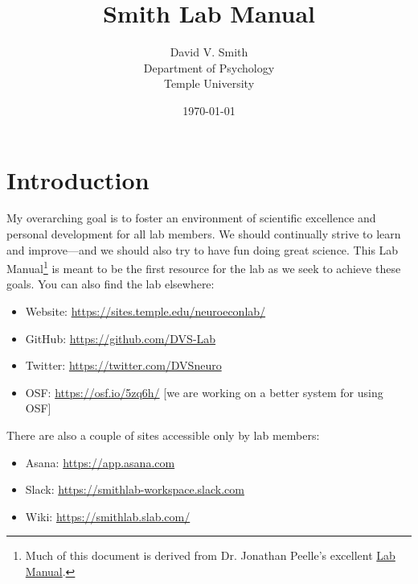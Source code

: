 \documentclass[letterpaper,11pt,oneside]{memoir}
\begin{document}
\title{Smith Lab Manual}
\author{David V. Smith\\Department of Psychology\\Temple University}
\date{\today}


\maketitle

\pagestyle{titlingpage}


\cleardoublepage
\frontmatter
\tableofcontents
\cleardoublepage

\mainmatter

\pagestyle{headings}

\chapter{Introduction}

My overarching goal is to foster an environment of scientific excellence and personal development for all lab members. We should continually strive to learn and improve---and we should also try to have fun doing great science. This Lab Manual\footnote{Much of this document is derived from Dr. Jonathan Peelle's excellent \href{https://github.com/jpeelle/peellelab\_manual/}{Lab Manual}.} is meant to be the first resource for the lab as we seek to achieve these goals. You can also find the lab elsewhere:

\begin{itemize}[noitemsep]
\item Website: \url{https://sites.temple.edu/neuroeconlab/}
\item GitHub: \url{https://github.com/DVS-Lab}
\item Twitter: \url{https://twitter.com/DVSneuro}
\item OSF: \url{https://osf.io/5zq6h/} \footnotesize{[we are working on a better system for using OSF]}
\end{itemize}

\noindent There are also a couple of sites accessible only by lab members:

\begin{itemize}[noitemsep]
\item Asana: \url{https://app.asana.com}
\item Slack: \url{https://smithlab-workspace.slack.com}
\item Wiki: \url{https://smithlab.slab.com/}
\end{itemize}
\end{document}
